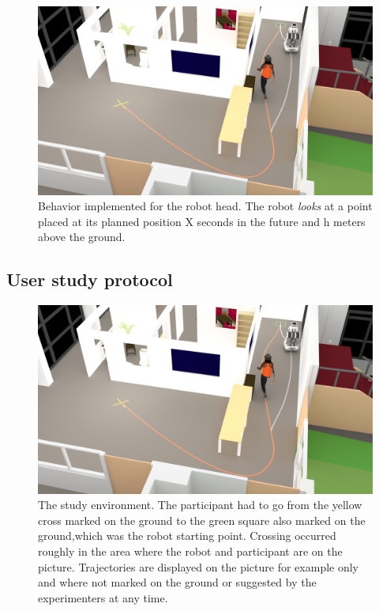 \documentclass[a4paper,11pt,twoside]{StyleThese}
\begin{document}
\begin{figure}[hbtp]
\centering
\includegraphics[scale=0.4]{figures/chapter2/expe_human-min.png}
\caption{Behavior implemented for the robot head. The robot \textit{looks} at a point placed at its planned position X seconds in the future and h meters above the ground.}
\label{experiment_adream}
\end{figure}

\subsection{User study protocol}

\begin{figure}[hbtp]
\centering
\includegraphics[scale=0.4]{figures/chapter2/expe_human-min.png}
\caption{The  study  environment.  The  participant  had  to  go  from  the  yellow  cross  marked  on  the  ground  to  the  green  square  also  marked  on  the  ground,which was the robot starting point. Crossing occurred roughly in the area where the robot and participant are on the picture. Trajectories are displayed on the picture for example only and where not marked on the ground or suggested by the experimenters at any time.}
\label{head_gaze_behavior}
\end{figure}
\end{document}
